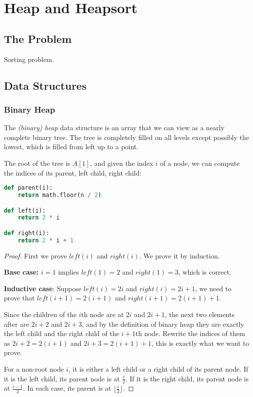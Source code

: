 \documentclass[11pt]{article}
\begin{document}
\section{Heap and Heapsort}

\subsection{The Problem}

Sorting problem.

\subsection{Data Structures}

\subsubsection{Binary Heap}

The \emph{(binary) heap} data structure is an array that we can view as a nearly
complete binary tree. The tree is completely filled on all levels except possibly
the lowest, which is filled from left up to a point.

The root of the tree is $A[1]$, and given the index $i$ of a node, we can compute
the indices of its parent, left child, right child:
\begin{lstlisting}[language=Python]
def parent(i):
    return math.floor(n / 2)

def left(i):
    return 2 * i

def right(i):
    return 2 * i + 1
\end{lstlisting}

\begin{proof}
First we prove $left(i)$ and $right(i)$. We prove it by induction.

\textbf{Base case:} $i=1$ implies $left(1)=2$ and $right(1)=3$, which is correct.

\textbf{Inductive case}: Suppose $left(i)=2i$ and $right(i)=2i+1$, we need to prove
that $left(i+1)=2(i+1)$ and $right(i+1)=2(i+1)+1$.

Since the children of the $i$th node are at $2i$ and $2i+1$, the next two elements
after are $2i+2$ and $2i+3$, and by the definition of binary heap they are exactly
the left child and the right child of the $i+1$th node. Rewrite the indices of them
as $2i+2=2(i+1)$ and $2i+3=2(i+1)+1$, this is exactly what we want to prove.

For a non-root node $i$, it is either a left child or a right child of its parent
node. If it is the left child, its parent node is at $\frac{i}{2}$. If it is the
right child, its parent node is at $\frac{i-1}{2}$. In each case, its parent is at
$\lfloor\frac{i}{2}\rfloor$.
\end{proof}
\end{document}
